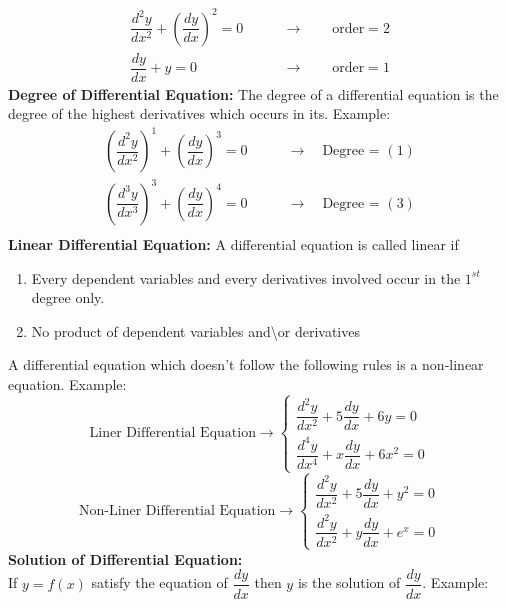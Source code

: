 \documentclass[a4aper,12pt]{report}
\begin{document}
    \begin{align*}
        \dfrac{d^2y}{dx^2}+ \left(\dfrac{dy}{dx}\right)^2 = 0 \qquad &\longrightarrow \qquad \text{order} = 2 \\ 
        \dfrac{dy}{dx}+y = 0\qquad &\longrightarrow \qquad \text{order} = 1
    \end{align*}
    \vspace*{10pt}
    \textbf{Degree of Differential Equation: } The degree of a differential equation is the degree of the highest derivatives which occurs in its. Example: 
    \begin{align*}
        \left(\dfrac{d^2y}{dx^2}\right)^1+\left(\dfrac{dy}{dx}\right)^3=0 \qquad &\longrightarrow \quad \text{Degree = }(1) \\ 
        \left(\dfrac{d^3y}{dx^3}\right)^3+\left(\dfrac{dy}{dx}\right)^4=0 \qquad &\longrightarrow \quad \text{Degree = }(3) \\ 
    \end{align*}
    \textbf{Linear Differential Equation: } A differential equation is called linear if \begin{enumerate}
        \item Every dependent variables and every derivatives involved occur in the $1^{st}$ degree only. 
        \item No product of dependent variables and\textbackslash or derivatives 
    \end{enumerate}
    A differential equation which doesn't follow the following rules is a non-linear equation.
    Example: 
    \begin{equation*}
   \text{Liner Differential Equation} \longrightarrow \left\{
   \begin{array}{c}
     \dfrac{d^2y}{dx^2}+5\dfrac{dy}{dx}+6y=0 \\ [10pt] 
     \dfrac{d^4y}{dx^4}+x\dfrac{dy}{dx}+6x^2=0 
   \end{array}
   \right.
\end{equation*}
\begin{equation*}
   \text{Non-Liner Differential Equation} \longrightarrow \left\{
   \begin{array}{c}
     \dfrac{d^2y}{dx^2}+5\dfrac{dy}{dx}+y^2=0 \\ [10pt] 
     \dfrac{d^2y}{dx^2}+y\dfrac{dy}{dx}+e^x=0 
   \end{array}
   \right.
\end{equation*}
\textbf{\large Solution of Differential Equation: }\\ [7pt]
If $y=f(x)$ satisfy the equation of $\dfrac{dy}{dx}$ then $y$ is the solution of $\dfrac{dy}{dx}$. Example: 
\end{document}
